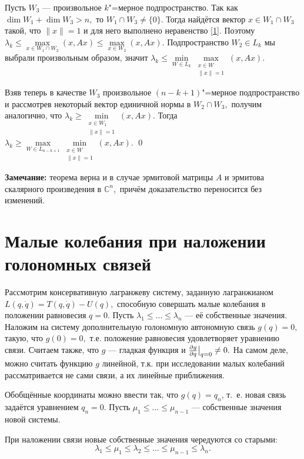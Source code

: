 \documentclass[11pt,a4paper]{article}
\begin{document}
Пусть $W_3$ --- произвольное $k$"=мерное подпространство.
Так как $\dim W_1+\dim W_3>n,$ то $W_1\cap W_3\ne\{0\}.$ 
Тогда найдётся вектор $x\in W_1\cap W_3$ такой, что $\|x\|=1$ и 
для него выполнено неравенство \eqref{1}.
Поэтому $\lambda_k\leqslant\max\limits_{x\in W_1\cap W_2}(x,Ax)\leqslant\max\limits_{x\in W_2}(x,Ax).$ 
Подпространство $W_2\in L_k$ мы выбрали произвольным образом, значит $\lambda_k\leqslant\min\limits_{W\in L_{k}}\max\limits_{\substack{x\in W\\\|x\|=1}}(x,Ax).$

Взяв теперь в качестве $W_3$ произвольное $(n-k+1)$"=мерное подпространство и рассмотрев некоторый вектор единичной нормы в $W_2\cap W_3,$ получим аналогично, что $\lambda_k\geqslant\min\limits_{\substack{x\in W_1\\\|x\|=1}}(x,Ax).$ Тогда $\lambda_k\geqslant\max\limits_{W\in L_{n-k+1}}\min\limits_{\substack{x\in W\\\|x\|=1}}(x,Ax).$
\qed

\textbf{Замечание:}
теорема верна и в случае эрмитовой матрицы $A$ и эрмитова скалярного произведения в $\mathbb C^n,$ причём доказательство переносится без изменений.
\section{Малые колебания при наложении голономных связей}

Рассмотрим консервативную лагранжеву систему, заданную лагранжианом $L(q,\dot q)=T(q,\dot q)-U(q),$ способную совершать малые колебания в положении равновесия $q=0$. Пусть $\lambda_1\leqslant\ldots\leqslant\lambda_n$ --- её собственные значения. Наложим на систему дополнительную голономную автономную связь $g(q)=0,$ такую, что $g(0)=0,$ т.е. положение равновесия удовлетворяет уравнению связи. Считаем также, что $g$ --- гладкая функция и $\frac{\partial g}{\partial q}\big{|}_{q=0}\ne0.$ На самом деле, можно считать функцию $g$ линейной, т.к. при исследовании малых колебаний рассматривается не сами связи, а их линейные приближения.

Обобщённые координаты можно ввести так, что $g(q)=q_n$, т.~е. новая связь задаётся уравнением $q_n=0.$ Пусть $\mu_1\leqslant\ldots\leqslant \mu_{n-1}$ --- собственные значения новой системы.

\begin{theorem} 
При наложении связи новые собственные значения чередуются со старыми: $$\lambda_1\leqslant\mu_1\leqslant\lambda_2\leqslant\ldots\leqslant\mu_{n-1}\leqslant\lambda_n.$$
\end{theorem}
\end{document}
